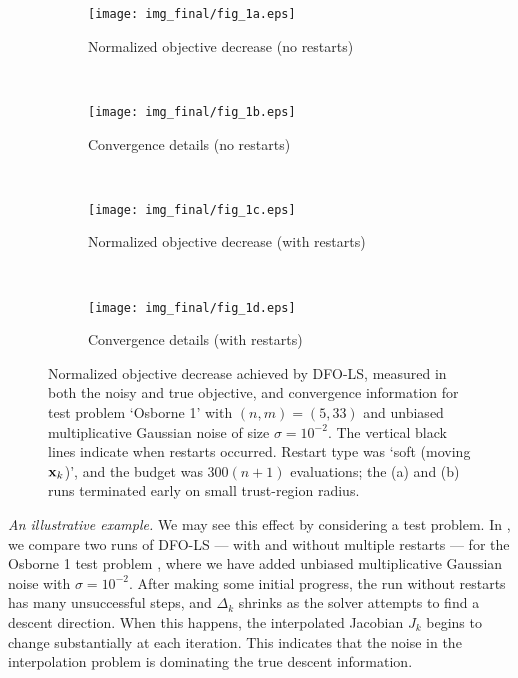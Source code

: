 \begin{figure}[t]
	\centering
	\begin{subfigure}[b]{0.48\textwidth}
		\texttt{[image: img\_final/fig\_1a.eps]}
		\caption{Normalized objective decrease (no restarts)}
	\end{subfigure}
	~
	\begin{subfigure}[b]{0.48\textwidth}
		\texttt{[image: img\_final/fig\_1b.eps]}
		\caption{Convergence details (no restarts)}
	\end{subfigure}
	\\
	\begin{subfigure}[b]{0.48\textwidth}
		\texttt{[image: img\_final/fig\_1c.eps]}
		\caption{Normalized objective decrease (with restarts)}
		\label{fig_restarts_motivation_with_restarts_obj_redn}
	\end{subfigure}
	~
	\begin{subfigure}[b]{0.48\textwidth}
		\texttt{[image: img\_final/fig\_1d.eps]}
		\caption{Convergence details (with restarts)}
	\end{subfigure}
	\caption{Normalized objective decrease achieved by DFO-LS, measured in both the noisy and true objective, and convergence information for test problem `Osborne 1' with $(n,m)=(5,33)$ and unbiased multiplicative Gaussian noise of size $\sigma=10^{-2}$. 
	The vertical black lines indicate when restarts occurred. Restart type was `soft (moving $\mathbf{x}_k$)', and the budget was $300(n+1)$ evaluations;  the (a) and (b) runs terminated early on small trust-region radius.
	}
	\label{fig_restarts_motivation}
\end{figure}

{\it An illustrative example.} We may see this effect by considering a test problem.
In , we compare two runs of DFO-LS --- with and without multiple restarts --- for the Osborne 1 test problem \cite[Problem 36]{More2009}, where we have added unbiased multiplicative Gaussian noise with $\sigma=10^{-2}$.
After making some initial progress, the run without restarts has many unsuccessful steps, and $\Delta_k$ shrinks as the solver attempts to find a descent direction.
When this happens, the interpolated Jacobian $J_k$ begins to change substantially at each iteration.
This indicates that the noise in the interpolation problem is dominating the true descent information.

